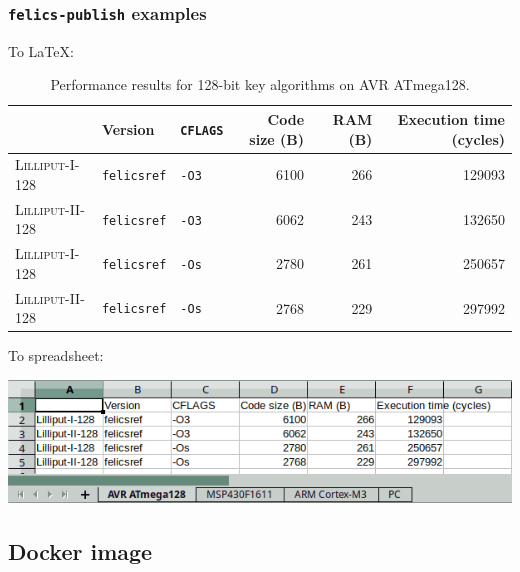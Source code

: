 \documentclass[english]{beamer}
\begin{document}
\begin{frame}
  \frametitle{\texttt{felics-publish} examples}

  To \LaTeX:

  \begin{table}[H]
    \centering
    \tiny
    \begin{tabular}{l|l|l||r|r|r}
      \textbf{}                & \textbf{Version}   & \textbf{\texttt{CFLAGS}} & \textbf{Code size (B)} & \textbf{RAM (B)} & \textbf{Execution time (cycles)} \\ \hline
      \textsc{Lilliput-I-128}  & \texttt{felicsref} & \texttt{-O3}             &                   6100 &              266 &                           129093 \\ \hline
      \textsc{Lilliput-II-128} & \texttt{felicsref} & \texttt{-O3}             &                   6062 &              243 &                           132650 \\ \hline
      \textsc{Lilliput-I-128}  & \texttt{felicsref} & \texttt{-Os}             &                   2780 &              261 &                           250657 \\ \hline
      \textsc{Lilliput-II-128} & \texttt{felicsref} & \texttt{-Os}             &                   2768 &              229 &                           297992 \\ \hline
    \end{tabular}
    \caption{Performance results for 128-bit key algorithms on AVR ATmega128.}
    \label{table:bench-soft-128-avr}
  \end{table}


  To spreadsheet:

  \includegraphics[width=\textwidth]{figures/felics-publish-ods.png}


\end{frame}

\subsection{Docker image}
\end{document}
